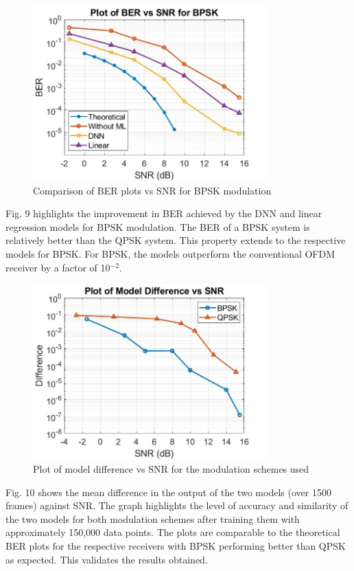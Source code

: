 \documentclass[conference]{IEEEtran}
\begin{document}
\begin{figure}[htbp]
\centerline{\includegraphics[width=9cm]{ber_plot_bpskv2.jpg}}
\caption{Comparison of BER plots vs SNR for BPSK modulation}
\label{qpsk}
\end{figure}

Fig. 9 highlights the improvement in BER achieved by the DNN and linear regression models for BPSK modulation. The BER of a BPSK system is relatively better than the QPSK system. This property extends to the respective models for BPSK. For BPSK, the models outperform the conventional OFDM receiver by a factor of 10$^{-2}$.

\begin{figure}[htbp]
\centerline{\includegraphics[width=9cm]{model_differencev2.jpg}}
\caption{Plot of model difference vs SNR for the modulation schemes used}
\label{model_diff}
\end{figure}

Fig. 10 shows the mean difference in the output of the two models (over 1500 frames) against SNR. The graph highlights the level of accuracy and similarity of the two models for both modulation schemes after training them with approximately 150,000 data points. The plots are comparable to the theoretical BER plots for the respective receivers with BPSK performing better than QPSK as expected. This validates the results obtained.
\end{document}

